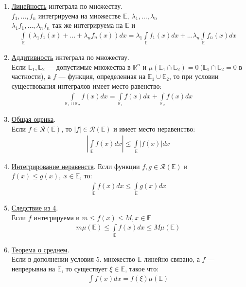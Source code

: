 \begin{enumerate}
  \item \underline{Линейность} интеграла по множеству. \\
    $f_1, \dots, f_n$ интегрируема на множестве $\mathbb{E}, \ \lambda_1, \dots, \lambda_n$
    \\
    $\lambda_1 f_1, \dots, \lambda_n f_n$ так же интегрируема на $\mathbb{E}$ и
    \begin{gather*}
      \int\limits_{\mathbb{E}} \left(\lambda_1 f_1(x) + \dots + \lambda_n
      f_n(x) \right) dx = \lambda_1 \int\limits_{\mathbb{E}} f_1(x) dx + \dots
      \lambda_n \int\limits_\mathbb{E} f_n(x) dx
    \end{gather*}
  \item \underline{Аддитивность} интеграла по множеству. \\
    Если $\mathbb{E}_1, \mathbb{E}_2$ --- допустимые множества в $\mathbb{R}^n$
    и $\mu(\mathbb{E}_1 \cap \mathbb{E}_2) = 0 \ (\mathbb{E}_1 \cap \mathbb{E}_2
    = 0$ в частности), а $f$ --- функция, определенная на $\mathbb{E}_1
    \cup \mathbb{E}_2$, то при условии существования интегралов имеет место
    равенство:
    \begin{gather*}
      \int\limits_{\mathbb{E}_1 \cup \mathbb{E}_2} f(x) dx =
      \int\limits_{\mathbb{E}_1} f(x) dx + \int\limits_{\mathbb{E}_2} f(x) dx
    \end{gather*}
  \item \underline{Общая оценка}. \\
    Если $f \in \mathcal{R}(\mathbb{E})$, то $|f| \in \mathcal{R}(\mathbb{E})$ и имеет место
    неравенство:
    \begin{gather*}
      \left| \int\limits_{\mathbb{E}} f(x) dx \right| \leq
      \int\limits_{\mathbb{E}} |f(x)| dx
    \end{gather*}
  \item \underline{Интегрирование неравенств}.
    Если функции $f, g \in \mathcal{R}(\mathbb{E})$ и $f(x) \leq g(x), \ x \in
    \mathbb{E}$, то:
    \begin{gather*}
      \int\limits_\mathbb{E} f(x) dx \leq \int\limits_\mathbb{E} g(x) dx
    \end{gather*}
  \item \underline{Следствие из 4}. \\
    Если $f$ интегрируема и $m \leq f(x) \leq M, x \in \mathbb{E}$
    \begin{gather*}
      m\mu(\mathbb{E}) \leq \int\limits_\mathbb{E} f(x)dx \leq M\mu(\mathbb{E})
    \end{gather*}
  \item \underline{Теорема о среднем}. \\
    Если в дополнении условия 5. множество $\mathbb{E}$ линейно связано, а $f$
    --- непрерывна на $\mathbb{E}$, то существует $\xi \in \mathbb{E}$, такое
    что:
    \begin{gather*}
      \int f(x) dx = f(\xi) \mu(\mathbb{E})
    \end{gather*}
\end{enumerate}

